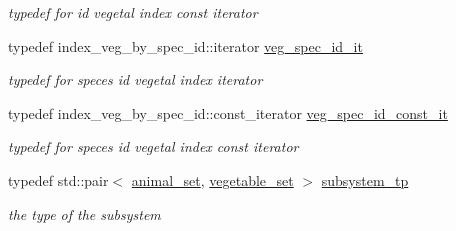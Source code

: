 \begin{DoxyCompactItemize}
\begin{DoxyCompactList}\small\item\em typedef for id vegetal index const iterator \end{DoxyCompactList}\item 
\hypertarget{classSubsystemContainer_a142f6962467d951f6c4051661412c4a9}{
typedef index\_\-veg\_\-by\_\-spec\_\-id::iterator \hyperlink{classSubsystemContainer_a142f6962467d951f6c4051661412c4a9}{veg\_\-spec\_\-id\_\-it}}
\label{classSubsystemContainer_a142f6962467d951f6c4051661412c4a9}

\begin{DoxyCompactList}\small\item\em typedef for speces id vegetal index iterator \end{DoxyCompactList}\item 
\hypertarget{classSubsystemContainer_a70f2a2528b029427a691668cddc65754}{
typedef index\_\-veg\_\-by\_\-spec\_\-id::const\_\-iterator \hyperlink{classSubsystemContainer_a70f2a2528b029427a691668cddc65754}{veg\_\-spec\_\-id\_\-const\_\-it}}
\label{classSubsystemContainer_a70f2a2528b029427a691668cddc65754}

\begin{DoxyCompactList}\small\item\em typedef for speces id vegetal index const iterator \end{DoxyCompactList}\item 
typedef std::pair$<$ \hyperlink{classSubsystemContainer_a8f87e58293188f19a139b1f9ac21fe3e}{animal\_\-set}, \hyperlink{classSubsystemContainer_aa11de189765005941e3c055feceb3db0}{vegetable\_\-set} $>$ \hyperlink{classSubsystemContainer_a2c517c44fccdecc58869c24ab6d3f667}{subsystem\_\-tp}
\begin{DoxyCompactList}\small\item\em the type of the subsystem \end{DoxyCompactList}\end{DoxyCompactItemize}
